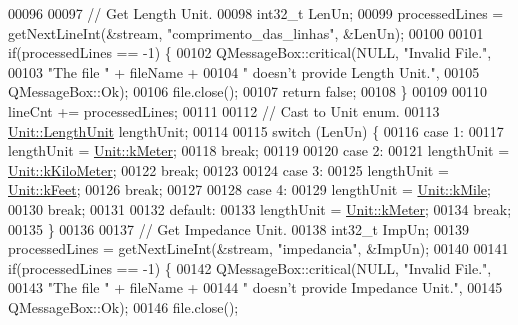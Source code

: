 \begin{DoxyCode}
00096 
00097   \textcolor{comment}{// Get Length Unit.}
00098   int32\_t LenUn;
00099   processedLines = getNextLineInt(&stream, \textcolor{stringliteral}{"comprimento\_das\_linhas"}, &LenUn);
00100 
00101   \textcolor{keywordflow}{if}(processedLines == -1) \{
00102     QMessageBox::critical(NULL, \textcolor{stringliteral}{"Invalid File."},
00103                           \textcolor{stringliteral}{"The file "} + fileName +
00104                           \textcolor{stringliteral}{" doesn't provide Length Unit."},
00105                           QMessageBox::Ok);
00106     file.close();
00107     \textcolor{keywordflow}{return} \textcolor{keyword}{false};
00108   \}
00109 
00110   lineCnt += processedLines;
00111 
00112   \textcolor{comment}{// Cast to Unit enum.}
00113   \hyperlink{class_unit_a8c8921f7b225ad6063b1cb573425b9a0}{Unit::LengthUnit} lengthUnit;
00114 
00115   \textcolor{keywordflow}{switch} (LenUn) \{
00116   \textcolor{keywordflow}{case} 1:
00117     lengthUnit = \hyperlink{class_unit_a8c8921f7b225ad6063b1cb573425b9a0abfa41ebe7ee649a1f02c9b8ae570434b}{Unit::kMeter};
00118     \textcolor{keywordflow}{break};
00119 
00120   \textcolor{keywordflow}{case} 2:
00121     lengthUnit = \hyperlink{class_unit_a8c8921f7b225ad6063b1cb573425b9a0a1c04f3dd196dbe1832a2658215b0d919}{Unit::kKiloMeter};
00122     \textcolor{keywordflow}{break};
00123 
00124   \textcolor{keywordflow}{case} 3:
00125     lengthUnit = \hyperlink{class_unit_a8c8921f7b225ad6063b1cb573425b9a0a9ac9b167b0ebce477fb53d6ace04ddc8}{Unit::kFeet};
00126     \textcolor{keywordflow}{break};
00127 
00128   \textcolor{keywordflow}{case} 4:
00129     lengthUnit = \hyperlink{class_unit_a8c8921f7b225ad6063b1cb573425b9a0a2ebde742068bbee0510de32fbb4cd724}{Unit::kMile};
00130     \textcolor{keywordflow}{break};
00131 
00132   \textcolor{keywordflow}{default}:
00133     lengthUnit = \hyperlink{class_unit_a8c8921f7b225ad6063b1cb573425b9a0abfa41ebe7ee649a1f02c9b8ae570434b}{Unit::kMeter};
00134     \textcolor{keywordflow}{break};
00135   \}
00136 
00137   \textcolor{comment}{// Get Impedance Unit.}
00138   int32\_t ImpUn;
00139   processedLines = getNextLineInt(&stream, \textcolor{stringliteral}{"impedancia"}, &ImpUn);
00140 
00141   \textcolor{keywordflow}{if}(processedLines == -1) \{
00142     QMessageBox::critical(NULL, \textcolor{stringliteral}{"Invalid File."},
00143                           \textcolor{stringliteral}{"The file "} + fileName +
00144                           \textcolor{stringliteral}{" doesn't provide Impedance Unit."},
00145                           QMessageBox::Ok);
00146     file.close();

\end{DoxyCode}
